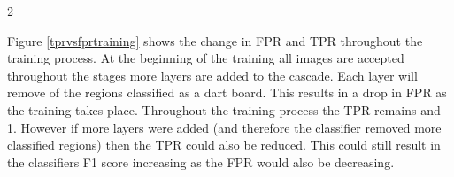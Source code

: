 \documentclass{article}
\begin{document}
\begin{multicols}{2}
\begin{multicols}{2}
{

  }
\end{multicols}{2}

Figure \ref{tprvsfprtraining} shows the change in FPR and TPR throughout the
training process. At the beginning of the training all images are accepted
throughout the stages more layers are added to the cascade. Each layer will
remove of the regions classified as a dart board. This results in a drop in FPR
as the training takes place. Throughout the training process the TPR remains
and 1. However if more layers were added (and therefore the classifier removed
more classified regions) then the TPR could also be reduced. This could still
result in the classifiers F1 score increasing as the FPR would also be
decreasing.


\end{multicols}
\end{document}

